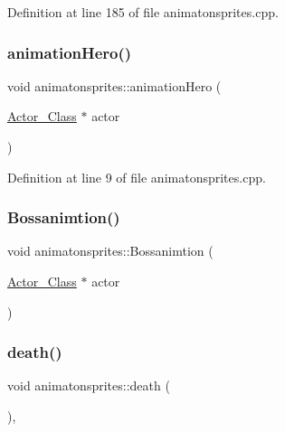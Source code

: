 Definition at line 185 of file animatonsprites.\+cpp.

\hypertarget{classanimatonsprites_a8f2c1a1d40776af39e45c125367fbc54}{}\label{classanimatonsprites_a8f2c1a1d40776af39e45c125367fbc54} 
\subsubsection{\texorpdfstring{animation\+Hero()}{animationHero()}}
{\footnotesize\ttfamily void animatonsprites\+::animation\+Hero (\begin{DoxyParamCaption}\item[{\hyperlink{class_actor___class}{Actor\+\_\+\+Class} $\ast$}]{actor }\end{DoxyParamCaption})}



Definition at line 9 of file animatonsprites.\+cpp.

\hypertarget{classanimatonsprites_a48b0fe9fa65a843657f026a1f56eedd8}{}\label{classanimatonsprites_a48b0fe9fa65a843657f026a1f56eedd8} 
\subsubsection{\texorpdfstring{Bossanimtion()}{Bossanimtion()}}
{\footnotesize\ttfamily void animatonsprites\+::\+Bossanimtion (\begin{DoxyParamCaption}\item[{\hyperlink{class_actor___class}{Actor\+\_\+\+Class} $\ast$}]{actor }\end{DoxyParamCaption})}

\hypertarget{classanimatonsprites_a50c1ab6bdeb5462156197f1208d8bde5}{}\label{classanimatonsprites_a50c1ab6bdeb5462156197f1208d8bde5} 
\subsubsection{\texorpdfstring{death()}{death()}}
{\footnotesize\ttfamily void animatonsprites\+::death (\begin{DoxyParamCaption}{ }\end{DoxyParamCaption})\hspace{0.3cm}{\ttfamily [inline]}, {\ttfamily [virtual]}}



